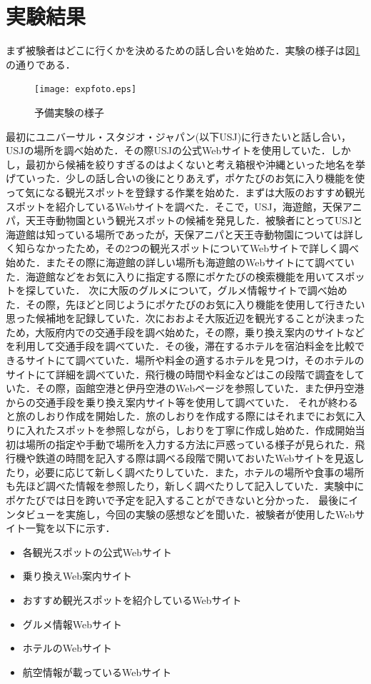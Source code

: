 \documentclass{funthesis}
\begin{document}
\section{実験結果}
まず被験者はどこに行くかを決めるための話し合いを始めた．実験の様子は図\ref{Lexpfoto}の通りである．

\begin{figure}[htpb]
\begin{center}
\texttt{[image: expfoto.eps]}
\end{center}
\caption{予備実験の様子}
\label{Lexpfoto}
\end{figure}


最初にユニバーサル・スタジオ・ジャパン(以下USJ)に行きたいと話し合い，USJの場所を調べ始めた．その際USJの公式Webサイトを使用していた．しかし，最初から候補を絞りすぎるのはよくないと考え箱根や沖縄といった地名を挙げていった．少しの話し合いの後にとりあえず，ポケたびのお気に入り機能を使って気になる観光スポットを登録する作業を始めた．まずは大阪のおすすめ観光スポットを紹介しているWebサイトを調べた．そこで，USJ，海遊館，天保アニパ，天王寺動物園という観光スポットの候補を発見した．被験者にとってUSJと海遊館は知っている場所であったが，天保アニパと天王寺動物園については詳しく知らなかったため，その2つの観光スポットについてWebサイトで詳しく調べ始めた．またその際に海遊館の詳しい場所も海遊館のWebサイトにて調べていた．海遊館などをお気に入りに指定する際にポケたびの検索機能を用いてスポットを探していた．
次に大阪のグルメについて，グルメ情報サイトで調べ始めた．その際，先ほどと同じようにポケたびのお気に入り機能を使用して行きたい思った候補地を記録していた．次におおよそ大阪近辺を観光することが決まったため，大阪府内での交通手段を調べ始めた，その際，乗り換え案内のサイトなどを利用して交通手段を調べていた．その後，滞在するホテルを宿泊料金を比較できるサイトにて調べていた．場所や料金の適するホテルを見つけ，そのホテルのサイトにて詳細を調べていた．飛行機の時間や料金などはこの段階で調査をしていた．その際，函館空港と伊丹空港のWebページを参照していた．また伊丹空港からの交通手段を乗り換え案内サイト等を使用して調べていた．
それが終わると旅のしおり作成を開始した．旅のしおりを作成する際にはそれまでにお気に入りに入れたスポットを参照しながら，しおりを丁寧に作成し始めた．作成開始当初は場所の指定や手動で場所を入力する方法に戸惑っている様子が見られた．飛行機や鉄道の時間を記入する際は調べる段階で開いておいたWebサイトを見返したり，必要に応じて新しく調べたりしていた．また，ホテルの場所や食事の場所も先ほど調べた情報を参照したり，新しく調べたりして記入していた．実験中にポケたびでは日を跨いで予定を記入することができないと分かった．
最後にインタビューを実施し，今回の実験の感想などを聞いた．被験者が使用したWebサイト一覧を以下に示す．
\begin{itemize}
 \item 各観光スポットの公式Webサイト
 \item 乗り換えWeb案内サイト
 \item おすすめ観光スポットを紹介しているWebサイト
 \item グルメ情報Webサイト
 \item ホテルのWebサイト
 \item 航空情報が載っているWebサイト
\end{itemize}
\end{document}

